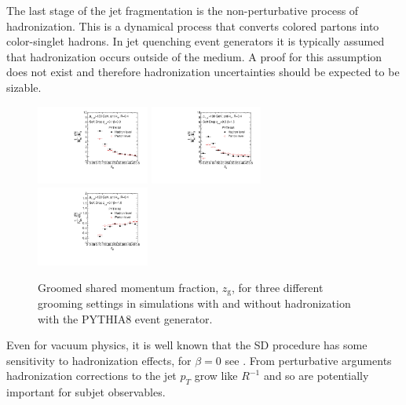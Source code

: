 The last stage of the jet fragmentation is the non-perturbative process of hadronization. This is a dynamical process that converts colored partons into color-singlet hadrons. In jet quenching event generators it is typically assumed that hadronization occurs outside of the medium. A proof for this assumption does not exist and therefore hadronization uncertainties should be expected to be sizable. 

\begin{figure}[th]
\centering
\includegraphics[width=0.33\textwidth]{figures/SDGen/ZgPytHadVsPartBeta00Z01.pdf}%
\includegraphics[width=0.33\textwidth]{figures/SDGen/ZgPytHadVsPartBeta15Z05.pdf}%
\includegraphics[width=0.33\textwidth]{figures/SDGen/ZgPytHadVsPartBetam1Z01.pdf}%
\caption{Groomed shared momentum fraction, $z_{\mathrm{g}}$, for three different grooming settings in simulations with and without hadronization with the PYTHIA8 event generator.}
\label{fig:SDGenZGHadVsPart}
\end{figure}
Even for vacuum physics, it is well known that the SD procedure has some sensitivity to hadronization effects, for $\beta = 0$ see \cite{Dasgupta:2015yua}.
From perturbative arguments hadronization corrections to the jet $p_{T}$ grow like $R^{-1}$ \cite{Dasgupta:2007wa} and
so are potentially important for subjet observables.
